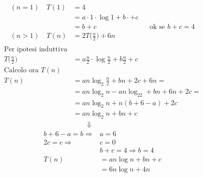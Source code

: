 \begin{align*}
	(n = 1) \quad T(1) & = 4 \\
	& = a \cdot 1 \cdot \log 1 + b \cdot + c \\
	& = b + c && \text{ok se } b + c = 4 \\
	(n > 1) \quad T(n) & = 2T \big( \frac{n}{2} \big) + 6n \\
\end{align*}
\begin{align*}
	\text{Per ipotesi induttiva} \\
	T \big( \frac{n}{2} \big) & = a \frac{n}{2} \cdot \log \frac{n}{2} + b \frac{n}{2} + c \\
	\text{Calcolo ora } T(n) \\
	T(n) & = an \log_2 \frac{n}{2} + bn + 2c + 6n = \\
	& = an \log_2n - an \log_22 + bn + 6n + 2c = \\
	& = an \log_2n + n(b + 6 - a) + 2c \\
	& = an \log_2n + bn + c \\
	& \qquad \Downarrow
\end{align*}
\begin{align*}
	b + 6 - a = b \Rightarrow & a = 6 \\
	2c = c \Rightarrow & c = 0 \\
	& b + c = 4 \Rightarrow b = 4 \\
	T(n) &= an \log n + bn + c \\
	&= 6n \log n + 4n
\end{align*}